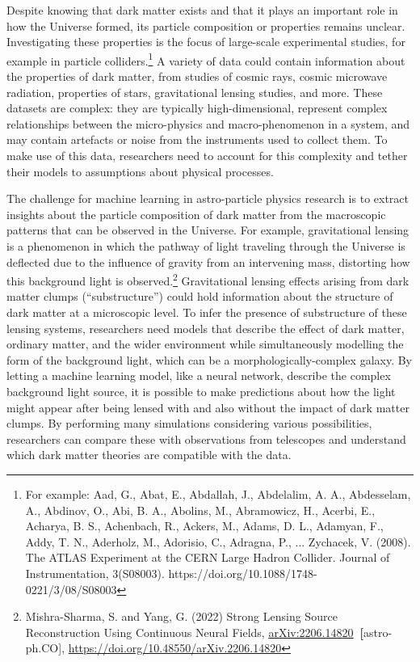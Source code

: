 Despite knowing that dark matter exists and that it plays an important
role in how the Universe formed, its particle composition or properties
remains unclear. Investigating these properties is the focus of
large-scale experimental studies, for example in particle
colliders.\footnote{For example: Aad, G., Abat, E., Abdallah, J.,
  Abdelalim, A. A., Abdesselam, A., Abdinov, O., Abi, B. A., Abolins,
  M., Abramowicz, H., Acerbi, E., Acharya, B. S., Achenbach, R., Ackers,
  M., Adams, D. L., Adamyan, F., Addy, T. N., Aderholz, M., Adorisio,
  C., Adragna, P., ... Zychacek, V. (2008). The ATLAS Experiment at the
  CERN Large Hadron Collider. Journal of Instrumentation, 3(S08003).
  https://doi.org/10.1088/1748-0221/3/08/S08003} A variety of data could
contain information about the properties of dark matter, from studies of
cosmic rays, cosmic microwave radiation, properties of stars,
gravitational lensing studies, and more. These datasets are complex:
they are typically high-dimensional, represent complex relationships
between the micro-physics and macro-phenomenon in a system, and may
contain artefacts or noise from the instruments used to collect them. To
make use of this data, researchers need to account for this complexity
and tether their models to assumptions about physical processes.

The challenge for machine learning in astro-particle physics research is
to extract insights about the particle composition of dark matter from
the macroscopic patterns that can be observed in the Universe. For
example, gravitational lensing is a phenomenon in which the pathway of
light traveling through the Universe is deflected due to the influence
of gravity from an intervening mass, distorting how this background
light is observed.\footnote{Mishra-Sharma, S. and Yang, G. (2022) Strong
  Lensing Source Reconstruction Using Continuous Neural Fields,
  \href{https://arxiv.org/abs/2206.14820}{\uline{arXiv:2206.14820}}\textbf{~{[}}astro-ph.CO{]},
  \url{https://doi.org/10.48550/arXiv.2206.14820}} Gravitational lensing
effects arising from dark matter clumps (``substructure'') could hold
information about the structure of dark matter at a microscopic level.
To infer the presence of substructure of these lensing systems,
researchers need models that describe the effect of dark matter,
ordinary matter, and the wider environment while simultaneously
modelling the form of the background light, which can be a
morphologically-complex galaxy. By letting a machine learning model,
like a neural network, describe the complex background light source, it
is possible to make predictions about how the light might appear after
being lensed with and also without the impact of dark matter clumps. By
performing many simulations considering various possibilities,
researchers can compare these with observations from telescopes and
understand which dark matter theories are compatible with the data.

